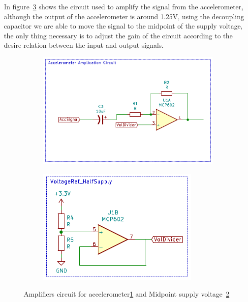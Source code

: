 In figure~\ref{fig:accCircCom} shows the circuit used to amplify the signal from the accelerometer, although the output of the accelerometer is around 1.25V, using the decoupling capacitor we are able to move the signal to the midpoint of the supply voltage, the only thing necessary is to adjust the gain of the circuit according to the desire relation between the input and output signals.
\begin{figure}[]
    \centering
    \begin{subfigure}{0.3\textwidth}
        \centering
        \includegraphics[width=\linewidth]{Chapters/4CHP/Figures/AmpAccCirc.pdf}
        \caption{}{}
        \label{subfig:AccAmpCirc}
    \end{subfigure}
    \begin{subfigure}{0.3\textwidth}
        \centering
        \includegraphics[width=\linewidth]{Chapters/4CHP/Figures/HalfSupply.pdf}
        \caption{}{}
        \label{subfig:VoltageDiv}
    \end{subfigure}
    \caption{Amplifiers circuit for accelerometer\ref{subfig:AccAmpCirc} and Midpoint supply voltage~\ref{subfig:VoltageDiv}}{}
\label{fig:accCircCom}
\end{figure}

